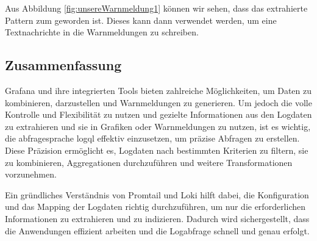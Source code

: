 Aus Abbildung \ref{fig:unsereWarnmeldung1} können wir sehen, dass das extrahierte Pattern zum  geworden ist. Dieses kann dann verwendet werden, um eine Textnachrichte in die Warnmeldungen zu schreiben.


\newpage
\subsection{Zusammenfassung}
Grafana und ihre integrierten Tools bieten zahlreiche Möglichkeiten, um Daten zu kombinieren, darzustellen und Warnmeldungen zu generieren. Um jedoch die volle Kontrolle und Flexibilität zu nutzen und gezielte Informationen aus den Logdaten zu extrahieren und sie in Grafiken oder Warnmeldungen zu nutzen, ist es wichtig, die \gls{abfragesprache} \gls{logql} effektiv einzusetzen, um präzise Abfragen zu erstellen. Diese Präzision ermöglicht es, Logdaten nach bestimmten Kriterien zu filtern, sie zu kombinieren, Aggregationen durchzuführen und weitere Transformationen vorzunehmen.

Ein gründliches Verständnis von Promtail und Loki hilft dabei, die Konfiguration und das Mapping der Logdaten richtig durchzuführen, um nur die erforderlichen Informationen zu extrahieren und zu indizieren. Dadurch wird sichergestellt, dass die Anwendungen effizient arbeiten und die Logabfrage schnell und genau erfolgt.


